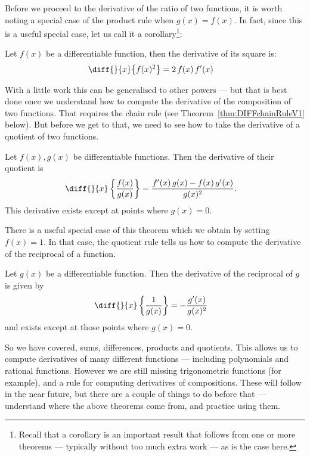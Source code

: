 Before we proceed to the derivative of the ratio of two functions, it is worth noting a
special case of the product rule when $g(x)=f(x)$. In fact, since this is a useful
special case, let us call it a corollary\footnote{Recall that a corollary is an important
result that follows from one or more theorems --- typically without too much extra work
--- as is the case here.}:
\begin{cor}\label{cor_2_4}
Let $f(x)$ be a differentiable function, then the derivative of its square is:
\begin{align*}
  \diff{}{x} \big\{ f(x)^2 \big\} &=  2\, f(x)\, f'(x)
\end{align*}
\end{cor}
With a little work this can be generalised to other powers --- but that is best done once
we understand how to compute the derivative of the composition of two functions. That
requires the chain rule (see Theorem~\ref{thm:DIFFchainRuleV1} below). But before we get
to that, we need to see how to take the derivative of a quotient of two functions.

\begin{theorem}\label{thm:DIFFquotRule}
Let $f(x), g(x)$ be differentiable functions. Then the derivative of their quotient
is
\begin{align*}
  \diff{}{x} \left\{ \frac{f(x)}{g(x)} \right\} &=
\frac{f'(x) \, g(x) - f(x) \, g'(x)}{g(x)^2}.
\end{align*}
This derivative exists except at points where $g(x)=0$.
\end{theorem}
There is a useful special case of this theorem which we obtain by setting $f(x)=1$. In
that case, the quotient rule tells us how to compute the derivative of the reciprocal of
a function.
\begin{cor}\label{cor diff recip}
Let $g(x)$ be a differentiable function. Then the derivative of the reciprocal of $g$ is
given by
\begin{align*}
  \diff{}{x} \left\{ \frac{1}{g(x)} \right\} &= -\frac{g'(x)}{g(x)^2}
\end{align*}
and exists except at those points where $g(x)=0$.
\end{cor}


So we have covered, sums, differences, products and quotients. This allows us
to compute derivatives of many different functions --- including polynomials
and rational functions. However we are still missing trigonometric functions
(for example), and a rule for computing derivatives of compositions. These will
follow in the near future, but there are a couple of things to do before that
--- understand where the above theorems come from, and practice using them.


